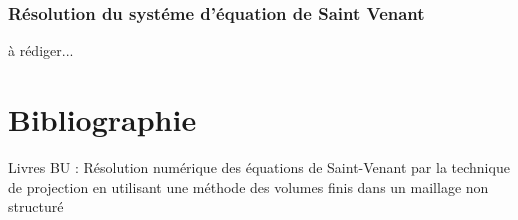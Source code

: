 \documentclass[12pt]{article}
\begin{document}
\subsubsection{Résolution du systéme d'équation de Saint Venant}
à rédiger...

\section{Bibliographie}
Livres BU : Résolution numérique des équations de Saint-Venant par la technique de projection en utilisant une méthode des volumes finis dans un maillage non structuré 



\end{document}
